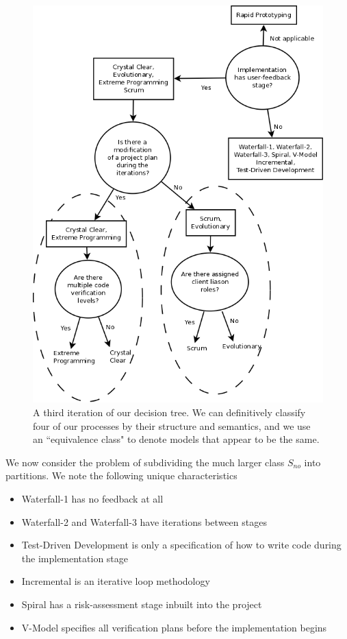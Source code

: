 \begin{figure}[ht!]
  \includegraphics[scale=0.4]{media/DecisionTree3}
  \caption{A third iteration of our decision tree. We can definitively classify
  four of our processes by their structure and semantics, and we use an
  ``equivalence class" to denote models that appear to be the same.}
  \label{DecTree3}
\end{figure}

We now consider the problem of subdividing the much larger class $S_{no}$ into
partitions.
We note the following unique characteristics
\begin{itemize}
  \item Waterfall-1 has no feedback at all
  \item Waterfall-2 and Waterfall-3 have iterations between stages
  \item Test-Driven Development is only a specification of how to write code
  during the implementation stage
  \item Incremental is an iterative loop methodology
  \item Spiral has a risk-assessment stage inbuilt into the project
  \item V-Model specifies all verification plans before the implementation
  begins
\end{itemize}


